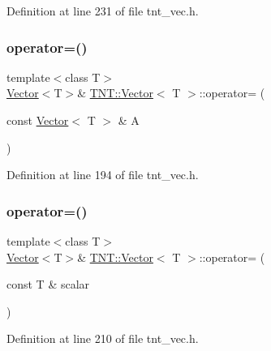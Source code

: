 Definition at line 231 of file tnt\+\_\+vec.\+h.

\mbox{\label{classTNT_1_1Vector_ad381a0e422ce8e5a46cc374ee07a8556}} 
\subsubsection{\texorpdfstring{operator=()}{operator=()}\hspace{0.1cm}{\footnotesize\ttfamily [1/2]}}
{\footnotesize\ttfamily template$<$class T$>$ \\
\hyperlink{classTNT_1_1Vector}{Vector}$<$T$>$\& \hyperlink{classTNT_1_1Vector}{T\+N\+T\+::\+Vector}$<$ T $>$\+::operator= (\begin{DoxyParamCaption}\item[{const \hyperlink{classTNT_1_1Vector}{Vector}$<$ T $>$ \&}]{A }\end{DoxyParamCaption})\hspace{0.3cm}{\ttfamily [inline]}}



Definition at line 194 of file tnt\+\_\+vec.\+h.

\mbox{\label{classTNT_1_1Vector_ab4cf6d14d44d75f6b82fcb9178920e11}} 
\subsubsection{\texorpdfstring{operator=()}{operator=()}\hspace{0.1cm}{\footnotesize\ttfamily [2/2]}}
{\footnotesize\ttfamily template$<$class T$>$ \\
\hyperlink{classTNT_1_1Vector}{Vector}$<$T$>$\& \hyperlink{classTNT_1_1Vector}{T\+N\+T\+::\+Vector}$<$ T $>$\+::operator= (\begin{DoxyParamCaption}\item[{const T \&}]{scalar }\end{DoxyParamCaption})\hspace{0.3cm}{\ttfamily [inline]}}



Definition at line 210 of file tnt\+\_\+vec.\+h.

